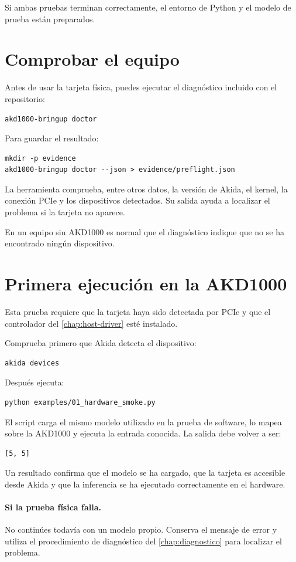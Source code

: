 Si ambas pruebas terminan correctamente, el entorno de Python y el modelo de prueba
están preparados.

\section{Comprobar el equipo}

Antes de usar la tarjeta física, puedes ejecutar el diagnóstico incluido con el
repositorio:

\begin{lstlisting}
akd1000-bringup doctor
\end{lstlisting}

Para guardar el resultado:

\begin{lstlisting}
mkdir -p evidence
akd1000-bringup doctor --json > evidence/preflight.json
\end{lstlisting}

La herramienta comprueba, entre otros datos, la versión de Akida, el kernel, la conexión
PCIe y los dispositivos detectados. Su salida ayuda a localizar el problema si la tarjeta no aparece.

En un equipo sin AKD1000 es normal que el diagnóstico indique que no se ha encontrado
ningún dispositivo.

\section{Primera ejecución en la AKD1000}

Esta prueba requiere que la tarjeta haya sido detectada por PCIe y que el controlador
del \cref{chap:host-driver} esté instalado.

Comprueba primero que Akida detecta el dispositivo:

\begin{lstlisting}
akida devices
\end{lstlisting}

Después ejecuta:

\begin{lstlisting}
python examples/01_hardware_smoke.py
\end{lstlisting}

El script carga el mismo modelo utilizado en la prueba de software, lo mapea sobre la
AKD1000 y ejecuta la entrada conocida. La salida debe volver a ser:

\begin{lstlisting}
[5, 5]
\end{lstlisting}

Un resultado  confirma que el modelo se ha cargado, que la tarjeta es
accesible desde Akida y que la inferencia se ha ejecutado correctamente en el hardware.

\paragraph{Si la prueba física falla.}
No continúes todavía con un modelo propio. Conserva el mensaje de error y utiliza el
procedimiento de diagnóstico del \cref{chap:diagnostico} para localizar el problema.
